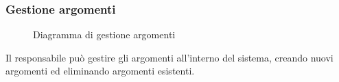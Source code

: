 \documentclass[a4paper, titlepage]{article}
\begin{document}
\subsubsection{Gestione argomenti}
\begin{figure}[H]
	\centering
	\noindent{}
	\caption{Diagramma di gestione argomenti}
\end{figure}
Il responsabile può gestire gli argomenti all’interno del sistema, creando nuovi argomenti ed eliminando argomenti esistenti.

\newpage
\end{document}
